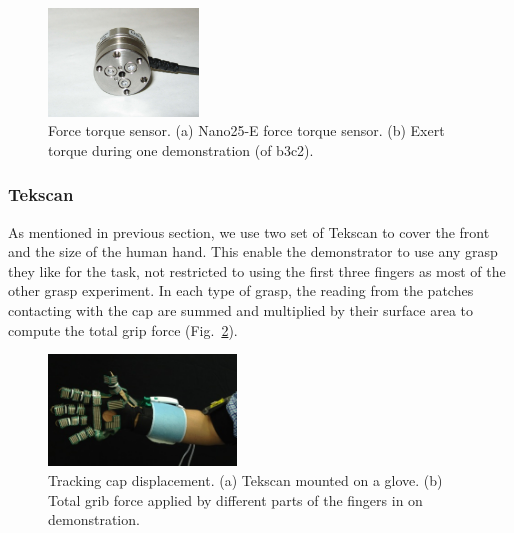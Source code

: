 \begin{figure}
  \centering
  \includegraphics[width=4cm]{./fig/Nano25-E.jpg}
  \vspace{0.2cm}
  \caption{ \scriptsize{Force torque sensor. (a) Nano25-E force torque sensor. (b) Exert torque during one demonstration (of b3c2). }
}
\label{fig:ftsensor}
\end{figure}

\subsubsection{Tekscan}
\label{tekscan}
As mentioned in previous section, we use two set of Tekscan to cover the front and the size of the human hand. This enable the demonstrator to use any grasp they like for the task, not restricted to using the first three fingers as most of the other grasp experiment. In each type of grasp, the reading from the patches contacting with the cap are summed and multiplied by their surface area to compute the total grip force (Fig.~\ref{fig:ftsensor}).

\begin{figure}
  \centering
  \includegraphics[width=5cm]{./fig/texscan2.jpg}
  \hspace{0.2cm}
  \caption{ \scriptsize{Tracking cap displacement. (a) Tekscan mounted on a glove. (b) Total grib force applied by different parts of the fingers in on demonstration. }
}
\label{fig:ftsensor}
\end{figure}

